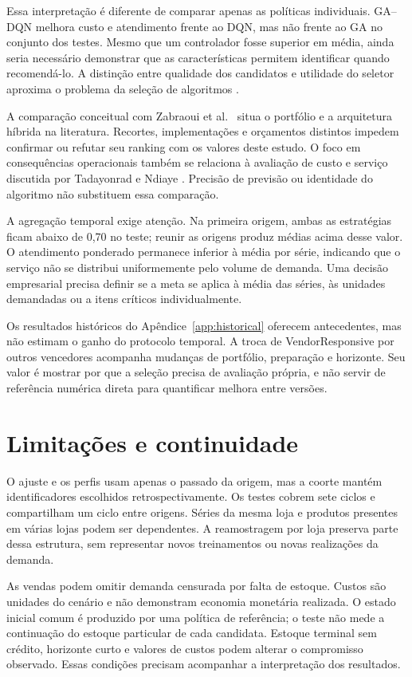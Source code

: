\documentclass[preprint,12pt]{elsarticle}
\begin{document}
Essa interpretação é diferente de comparar apenas as políticas individuais. GA--DQN melhora custo e atendimento frente ao DQN, mas não frente ao GA no conjunto dos testes. Mesmo que um controlador fosse superior em média, ainda seria necessário demonstrar que as características permitem identificar quando recomendá-lo. A distinção entre qualidade dos candidatos e utilidade do seletor aproxima o problema da seleção de algoritmos \cite{rice1976,Kotthoff2014AlgorithmSelection}.

A comparação conceitual com Zabraoui et al.\ \cite{sca_27e994c54848} situa o portfólio e a arquitetura híbrida na literatura. Recortes, implementações e orçamentos distintos impedem confirmar ou refutar seu ranking com os valores deste estudo. O foco em consequências operacionais também se relaciona à avaliação de custo e serviço discutida por Tadayonrad e Ndiaye \cite{sca_f81ad2b3e023}. Precisão de previsão ou identidade do algoritmo não substituem essa comparação.

A agregação temporal exige atenção. Na primeira origem, ambas as estratégias ficam abaixo de 0,70 no teste; reunir as origens produz médias acima desse valor. O atendimento ponderado permanece inferior à média por série, indicando que o serviço não se distribui uniformemente pelo volume de demanda. Uma decisão empresarial precisa definir se a meta se aplica à média das séries, às unidades demandadas ou a itens críticos individualmente.

Os resultados históricos do Apêndice~\ref{app:historical} oferecem antecedentes, mas não estimam o ganho do protocolo temporal. A troca de VendorResponsive por outros vencedores acompanha mudanças de portfólio, preparação e horizonte. Seu valor é mostrar por que a seleção precisa de avaliação própria, e não servir de referência numérica direta para quantificar melhora entre versões.

\section{Limitações e continuidade}
O ajuste e os perfis usam apenas o passado da origem, mas a coorte mantém identificadores escolhidos retrospectivamente. Os testes cobrem sete ciclos e compartilham um ciclo entre origens. Séries da mesma loja e produtos presentes em várias lojas podem ser dependentes. A reamostragem por loja preserva parte dessa estrutura, sem representar novos treinamentos ou novas realizações da demanda.

As vendas podem omitir demanda censurada por falta de estoque. Custos são unidades do cenário e não demonstram economia monetária realizada. O estado inicial comum é produzido por uma política de referência; o teste não mede a continuação do estoque particular de cada candidata. Estoque terminal sem crédito, horizonte curto e valores de custos podem alterar o compromisso observado. Essas condições precisam acompanhar a interpretação dos resultados.
\end{document}
